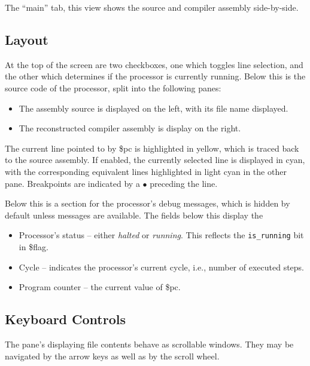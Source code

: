 \documentclass[10pt]{article}
\begin{document}
    The ``main'' tab, this view shows the source and compiler assembly side-by-side.

    \subsection{Layout}

    At the top of the screen are two checkboxes, one which toggles line selection, and the other which determines if the processor is currently running.
    Below this is the source code of the processor, split into the following panes:
    \begin{itemize}
        \item The assembly source is displayed on the left, with its file name displayed.
        \item The reconstructed compiler assembly is display on the right.
    \end{itemize}
    The current line pointed to by \$pc is highlighted in yellow, which is traced back to the source assembly.
    If enabled, the currently selected line is displayed in cyan, with the corresponding equivalent lines highlighted in light cyan in the other pane.
    Breakpoints are indicated by a {\color{red} \(\bullet\)} preceding the line.

    Below this is a section for the processor's debug messages, which is hidden by default unless messages are available.
    The fields below this display the
    \begin{itemize}
        \item Processor's status -- either \textit{halted} or \textit{running}.
        This reflects the \texttt{is\_running} bit in \$flag.
        \item Cycle -- indicates the processor's current cycle, i.e., number of executed steps.
        \item Program counter -- the current value of \$pc.
    \end{itemize}

    \subsection{Keyboard Controls}

    The pane's displaying file contents behave as scrollable windows.
    They may be navigated by the arrow keys as well as by the scroll wheel.
\end{document}

